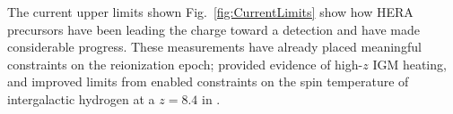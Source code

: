 \documentclass[preprint,11pt]{aastex}
\begin{document}
The current upper limits shown Fig.~\ref{fig:CurrentLimits} show how HERA precursors have been leading the charge toward a detection and have made considerable progress.
These measurements
have already placed meaningful constraints on the reionization epoch; 
\citet{parsons_et_al2013} provided evidence of high-$z$ IGM heating, and improved limits from
\citet{ali_et_al2015} enabled 
constraints on the spin temperature of intergalactic hydrogen at a
$z=8.4$ in \citet{pober_et_al2015}. 



\end{document}

